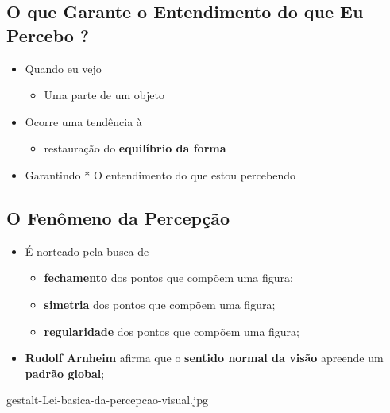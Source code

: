 \documentclass[
]{book}
\providecommand{\tightlist}{%
  \setlength{\itemsep}{0pt}\setlength{\parskip}{0pt}}
\begin{document}
\hypertarget{o-que-garante-o-entendimento-do-que-eu-percebo-1}{%
\subsection{O que Garante o Entendimento do que Eu Percebo ?}\label{o-que-garante-o-entendimento-do-que-eu-percebo-1}}

\begin{itemize}
\tightlist
\item
  Quando eu vejo

  \begin{itemize}
  \tightlist
  \item
    Uma parte de um objeto
  \end{itemize}
\item
  Ocorre uma tendência à

  \begin{itemize}
  \tightlist
  \item
    restauração do \textbf{equilíbrio da forma}
  \end{itemize}
\item
  Garantindo
  * O entendimento do que estou percebendo
\end{itemize}

\hypertarget{o-fenuxf4meno-da-percepuxe7uxe3o-1}{%
\subsection{O Fenômeno da Percepção}\label{o-fenuxf4meno-da-percepuxe7uxe3o-1}}

\begin{itemize}
\tightlist
\item
  É norteado pela busca de

  \begin{itemize}
  \tightlist
  \item
    \textbf{fechamento} dos pontos que compõem uma figura;
  \item
    \textbf{simetria} dos pontos que compõem uma figura;
  \item
    \textbf{regularidade} dos pontos que compõem uma figura;
  \end{itemize}
\item
  \textbf{Rudolf Arnheim} afirma que o \textbf{sentido normal da visão} apreende um \textbf{padrão global};
\end{itemize}

gestalt-Lei-basica-da-percepcao-visual.jpg
\end{document}

